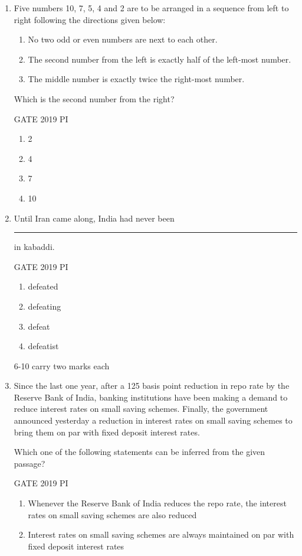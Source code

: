 \documentclass[journal,12pt,onecolumn]{IEEEtran}
\theoremstyle{remark}
\begin{document}
\begin{enumerate}
\item Five numbers 10, 7, 5, 4 and 2 are to be arranged in a sequence from left to right following the directions given below:
\begin{enumerate}
    \item No two odd or even numbers are next to each other.
    \item The second number from the left is exactly half of the left-most number.
    \item The middle number is exactly twice the right-most number.
\end{enumerate}
Which is the second number from the right?

\hfill{GATE 2019 PI}

\begin{multicols}{2}
\begin{enumerate}
    \item 2
    \item 4
    \item 7
    \item 10
\end{enumerate}
\end{multicols}
\item Until Iran came along, India had never been \rule{3cm}{0.15mm} in kabaddi.

\hfill{GATE 2019 PI}

\begin{multicols}{2}
\begin{enumerate}
    \item defeated
    \item defeating
    \item defeat
    \item defeatist
\end{enumerate}
\end{multicols}


6-10 carry two marks each
\item Since the last one year, after a 125 basis point reduction in repo rate by the Reserve Bank of India, banking institutions have been making a demand to reduce interest rates on small saving schemes. Finally, the government announced yesterday a reduction in interest rates on small saving schemes to bring them on par with fixed deposit interest rates.

Which one of the following statements can be inferred from the given passage?

\hfill{GATE 2019 PI}

\begin{multicols}{2}
\begin{enumerate}
    \item Whenever the Reserve Bank of India reduces the repo rate, the interest rates on small saving schemes are also reduced
    \item Interest rates on small saving schemes are always maintained on par with fixed deposit interest rates
    

\end{enumerate}
\end{multicols}
\end{enumerate}
\end{document}
